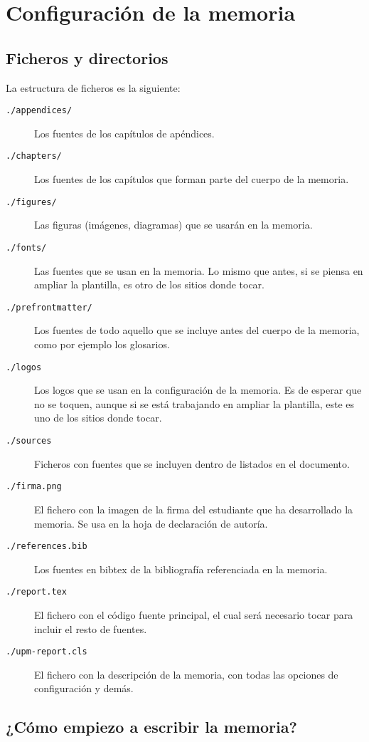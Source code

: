 \chapter{Configuración de la memoria}

\section{Ficheros y directorios}

La estructura de ficheros es la siguiente:

\begin{description}
    \item[\texttt{./appendices/}] Los fuentes de los capítulos de apéndices.
    \item[\texttt{./chapters/}] Los fuentes de los capítulos que forman parte del cuerpo de la memoria.
    \item[\texttt{./figures/}] Las figuras (imágenes, diagramas) que se usarán en la memoria.
    \item[\texttt{./fonts/}] Las fuentes que se usan en la memoria. Lo mismo que antes, si se piensa en ampliar la plantilla, es otro de los sitios donde tocar.
    \item[\texttt{./prefrontmatter/}] Los fuentes de todo aquello que se incluye antes del cuerpo de la memoria, como por ejemplo los glosarios.
    \item[\texttt{./logos}] Los logos que se usan en la configuración de la memoria. Es de esperar que no se toquen, aunque si se está trabajando en ampliar la plantilla, este es uno de los sitios donde tocar.
    \item[\texttt{./sources}] Ficheros con fuentes que se incluyen dentro de listados en el documento.
    \item[\texttt{./firma.png}] El fichero con la imagen de la firma del estudiante que ha desarrollado la memoria. Se usa en la hoja de declaración de autoría.
    \item[\texttt{./references.bib}] Los fuentes en bibtex de la bibliografía referenciada en la memoria.
    \item[\texttt{./report.tex}] El fichero con el código fuente principal, el cual será necesario tocar para incluir el resto de fuentes.
    \item[\texttt{./upm-report.cls}] El fichero con la descripción de la memoria, con todas las opciones de configuración y demás.
\end{description}

\section{¿Cómo empiezo a escribir la memoria?}

